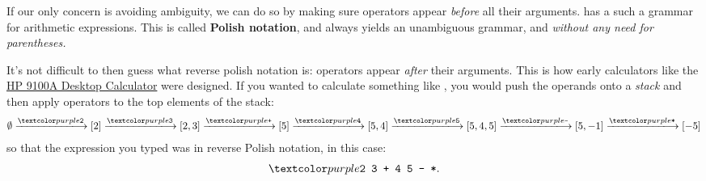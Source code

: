 If our only concern is avoiding ambiguity, we can do so by making sure operators appear \textit{before} all their arguments.
 has a such a grammar for arithmetic expressions.
This is called \textbf{Polish notation}, and always yields an unambiguous grammar, and \textit{without any need for parentheses.}

It's not difficult to then guess what reverse polish notation is: operators appear \textit{after} their arguments.
This is how early calculators like the \href{https://en.wikipedia.org/wiki/Hewlett-Packard_9100A]}{HP 9100A Desktop Calculator} were designed.
If you wanted to calculate something like , you would push the operands onto a \textit{stack} and then apply operators to the
top elements of the stack:
%
\begin{align*}
  \emptyset \xlongrightarrow{\codel{2}} [2]
  \xlongrightarrow{\codel{3}} [2, 3]
  \xlongrightarrow{\codel{+}} [5]
  \xlongrightarrow{\codel{4}} [5, 4]
  \xlongrightarrow{\codel{5}} [5, 4, 5]
  \xlongrightarrow{\codel{-}} [5, -1]
  \xlongrightarrow{\codel{*}} [-5]
\end{align*}
%
so that the expression you typed was in reverse Polish notation, in this case:
%
\begin{align*}
  \codel{2 3 + 4 5 - *}.
\end{align*}

